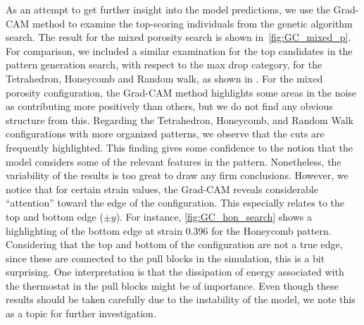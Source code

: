 As an attempt to get further insight into the model predictions, we use the Grad-CAM method to examine the top-scoring individuals from the genetic algorithm search. The result for the mixed porosity search is shown in~\cref{fig:GC_mixed_p}. For 
comparison, we included a similar examination for the top candidates in the
pattern generation search, with respect to the max drop category, for the
Tetrahedron, Honeycomb and Random walk, as shown in
. For the mixed porosity configuration, the Grad-CAM method highlights some areas in the noise 
as contributing more positively than others, but we do not find any obvious
structure from this. Regarding the Tetrahedron, Honeycomb, and Random Walk configurations with more organized patterns, we observe that the cuts are frequently highlighted. This finding gives some confidence to the notion that the model considers some of the relevant features in the pattern. Nonetheless, the variability of the results is too great to draw any firm conclusions. However, we notice that
for certain strain values, the Grad-CAM reveals considerable ``attention'' toward the edge of the configuration. This especially relates to the top and bottom edge ($\pm y$). For instance, \cref{fig:GC_hon_search} shows a highlighting of the bottom edge at strain 0.396 for the Honeycomb pattern. Considering that the top and bottom of the configuration are not a true edge, since these are connected to the pull blocks in the simulation, this is a bit surprising. One interpretation is that the dissipation of energy associated with the thermostat in the pull blocks might be of importance. Even though these results should be taken carefully due to the instability of the model, we note this as a topic for further investigation. 


